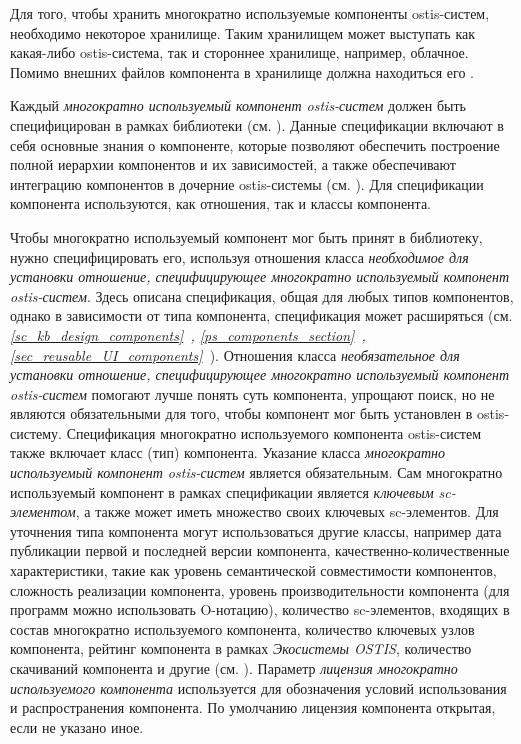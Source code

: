 Для того, чтобы хранить многократно используемые компоненты ostis-систем, необходимо некоторое хранилище. Таким хранилищем может выступать как какая-либо ostis-система, так и стороннее хранилище, например, облачное. Помимо внешних файлов компонента в хранилище должна находиться его .

Каждый \textit{многократно используемый компонент ostis-систем} должен быть специфицирован в рамках библиотеки (см. ). Данные спецификации включают в себя основные знания о компоненте, которые позволяют обеспечить построение полной иерархии компонентов и их зависимостей, а также обеспечивают  интеграцию компонентов в дочерние ostis-системы (см. ). Для спецификации компонента используются, как отношения, так и классы компонента.

Чтобы многократно используемый компонент мог быть принят в библиотеку, нужно специфицировать его, используя отношения класса \textit{необходимое для установки отношение, специфицирующее многократно используемый компонент ostis-систем}. Здесь описана спецификация, общая для любых типов компонентов, однако в зависимости от типа компонента, спецификация может расширяться (см. \textit{\ref{sc_kb_design_components}~, \ref{ps_components_section}~, \ref{sec_reusable_UI_components}~}). Отношения класса \textit{необязательное для установки отношение, специфицирующее многократно используемый компонент ostis-систем} помогают лучше понять суть компонента, упрощают поиск, но не являются обязательными для того, чтобы компонент мог быть установлен в ostis-систему. Спецификация многократно используемого компонента ostis-систем также включает класс (тип) компонента. Указание класса \textit{многократно используемый компонент ostis-систем} является обязательным. Сам многократно используемый компонент в рамках спецификации является \textit{ключевым sc-элементом}, а также может иметь множество своих ключевых sc-элементов. Для уточнения типа компонента могут использоваться другие классы, например дата публикации первой и последней версии компонента, качественно-количественные характеристики, такие как уровень семантической совместимости компонентов, сложность реализации компонента, уровень производительности компонента (для программ можно использовать O-нотацию), количество sc-элементов, входящих в состав многократно используемого компонента, количество ключевых узлов компонента, рейтинг компонента в рамках \textit{Экосистемы OSTIS}, количество скачиваний компонента и другие (см. ). Параметр \textit{лицензия многократно используемого компонента} используется для обозначения условий использования и распространения компонента. По умолчанию лицензия компонента открытая, если не указано иное.


